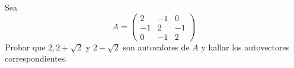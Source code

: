 \item Sea \[A=\begin{pmatrix}
        2&-1&0\\-1&2&-1\\0&-1&2
    \end{pmatrix}\]Probar que $2,2+\sqrt{2}$ y $2-\sqrt{2}$ son autovalores de $A$ y hallar los autovectores correspondientes.
    \begin{mdframed}[style=s]
        
    \end{mdframed}